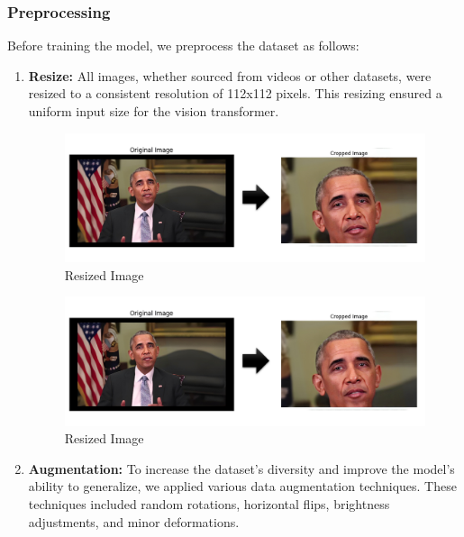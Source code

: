 \subsubsection{Preprocessing}

\noindent Before training the model, we preprocess the dataset as follows:

\begin{enumerate}
    \item \textbf{Resize:} All images, whether sourced from videos or other datasets, were resized to a consistent resolution of 112x112 pixels. This resizing ensured a uniform input size for the vision transformer.
          \begin{figure}[htbp]
              \centering
              \includegraphics[width= 5in ]{img/resized.jpg}
              \caption{Resized Image}
          \end{figure}
          \begin{figure}[htbp]
              \centering
              \includegraphics[width= 5in ]{img/resized.jpg}
              \caption{Resized Image}
          \end{figure}

    \item \textbf{Augmentation:} To increase the dataset's diversity and improve the model's ability to generalize, we applied various data augmentation techniques. These techniques included random rotations, horizontal flips, brightness adjustments, and minor deformations.


\end{enumerate}
